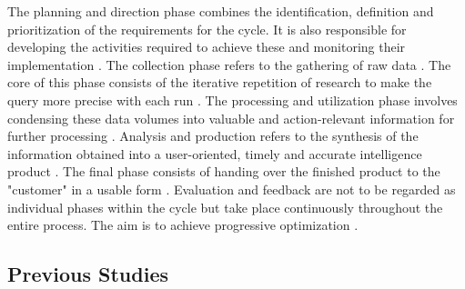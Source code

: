 \documentclass[10pt]{article}
\begin{document}
The planning and direction phase combines the identification, definition and prioritization
of the requirements for the cycle. It is also responsible for developing the activities
required to achieve these \cite{DepartmentoftheArmy.2012} and monitoring their implementation
\cite{JointChiefsofStaffU.S.Army.2013, DepartmentoftheArmy.2012}.
The collection phase refers to the gathering of raw data \cite{CentralIntelligenceAgency.1987}.
The core of this phase consists of the iterative repetition of research
\cite{NorthAtlanticTreatyOrganization.2001} to make the query more precise with each run
\cite{PastorGalindo.2020}. The processing and utilization phase involves condensing
these data volumes into valuable and action-relevant information for further processing
\cite{DirectorofNationalIntelligence.2011, JointChiefsofStaffU.S.Army.2013, PastorGalindo.2020, }.
Analysis and production refers to the synthesis of the information obtained into a
user-oriented, timely and accurate intelligence product
\cite{DepartmentoftheArmy.2012, Hwang.2022, NorthAtlanticTreatyOrganization.2001}.
The final phase consists of handing over the finished product to the "customer" in a
usable form \cite{CentralIntelligenceAgency.2023, DepartmentoftheArmy.2012, Williams.2018}.
Evaluation and feedback are not to be regarded as individual phases within the cycle
but take place continuously throughout the entire process. The aim is to achieve progressive optimization
\cite{DirectorofNationalIntelligence.2011, JointChiefsofStaffU.S.Army.2013, NorthAtlanticTreatyOrganization.2001}.

\subsection{Previous Studies}
\end{document}
